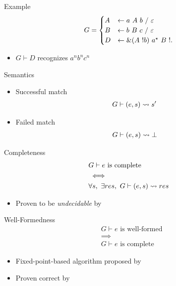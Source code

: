 \documentclass{beamer}
\begin{document}
\begin{frame}{Example}
    \begin{align*}
        G = \begin{cases}
            A& \leftarrow a\ A\ b\ /\ \varepsilon \\
            B& \leftarrow b\ B\ c\ /\ \varepsilon \\
            D& \leftarrow \&(A\ !b)\ a^\star\ B\ !.{}
        \end{cases}
    \end{align*}
    \begin{itemize}
        \item $G \vdash D$ recognizes $a^n b^n c^n$
    \end{itemize}
\end{frame}

\begin{frame}{Semantics}
    \begin{itemize}
        \item Successful match
        \begin{align*}
            G \vdash (e, s) \rightsquigarrow s'
        \end{align*}
        \item Failed match
        \begin{align*}
            G \vdash (e, s) \rightsquigarrow \bot
        \end{align*}
    \end{itemize}
\end{frame}

\begin{frame}{Completeness}
    \begin{align*}
        & \text{$G \vdash e$ is complete} \\
        & \iff \\
        & \forall s,\ \exists res,\ G \vdash (e, s) \rightsquigarrow res
    \end{align*}
    \begin{itemize}
        \item Proven to be \emph{undecidable} by \citeauthor{ford_parsing_2004}
    \end{itemize}
\end{frame}

\begin{frame}{Well-Formedness}
    \begin{align*}
        & \text{$G \vdash e$ is well-formed} \\
        & \implies \\
        & \text{$G \vdash e$ is complete}
    \end{align*}
    \begin{itemize}
        \item Fixed-point-based algorithm proposed by \cite{ford_parsing_2004}
        \item Proven correct by \cite{koprowski_trx_2011}
    \end{itemize}
\end{frame}
\end{document}
